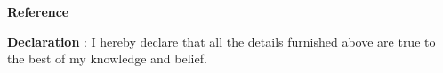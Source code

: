 \documentclass{article}
\begin{document}
 
 \begin{flushleft}
 	\vspace{0.4in}
 	\textbf{Reference} \hspace{0.75in} 
 \end{flushleft}
 
 \begin{flushleft}
 	\vspace{0.2in}
 	\textbf{Declaration} \hspace{0.60in} : I hereby declare that all the details furnished above are true to the best of
 	my knowledge and belief.
 \end{flushleft}
 
 
\end{document}
